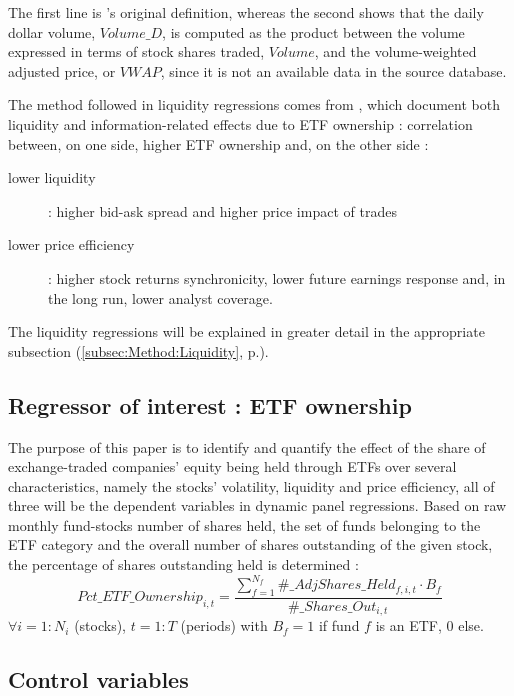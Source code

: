   The first line is \cite{Amihud2002}'s original definition, whereas the second shows that the daily dollar volume, $Volume\_D$, is computed as the product between the volume expressed in terms of stock shares traded, $Volume$, and the volume-weighted adjusted price, or $VWAP$, since it is not an available data in the source database.
  
The method followed in liquidity regressions comes from \cite{Israeli2017}, which document both liquidity and information-related effects due to ETF ownership : correlation between, on one side, higher ETF ownership  and, on the other side :
\begin{description}
\item[lower liquidity] : higher bid-ask spread and higher price impact of trades
\item[lower price efficiency] : higher stock returns synchronicity, lower future earnings response and, in the long run, lower analyst coverage.
\end{description}

The liquidity regressions will be explained in greater detail in the appropriate subsection (\autoref{subsec:Method:Liquidity}, p.\pageref{subsec:Method:Liquidity}).
\subsection{Regressor of interest : ETF ownership}
The purpose of this paper is to identify and quantify the effect of the share of exchange-traded companies' equity being held through ETFs over several characteristics, namely the stocks' volatility, liquidity and price efficiency, all of three will be the dependent variables in dynamic panel regressions. Based on raw monthly fund-stocks number of shares held, the set of funds belonging to the ETF category and the overall number of shares outstanding of the given stock, the percentage of shares outstanding held is determined :
\begin{equation}
  Pct\_ETF\_Ownership_{i, t} = \frac{\sum_{f = 1}^{N_{f}} \#\_AdjShares\_Held_{f, i, t}\cdot B_{f}}{\#\_Shares\_Out_{i, t}}
\end{equation}
$\forall i = 1:N_{i}$ (stocks), $t = 1:T$ (periods)
with $B_{f} = 1$ if fund $f$ is an ETF, $0$ else.
\subsection{Control variables}
